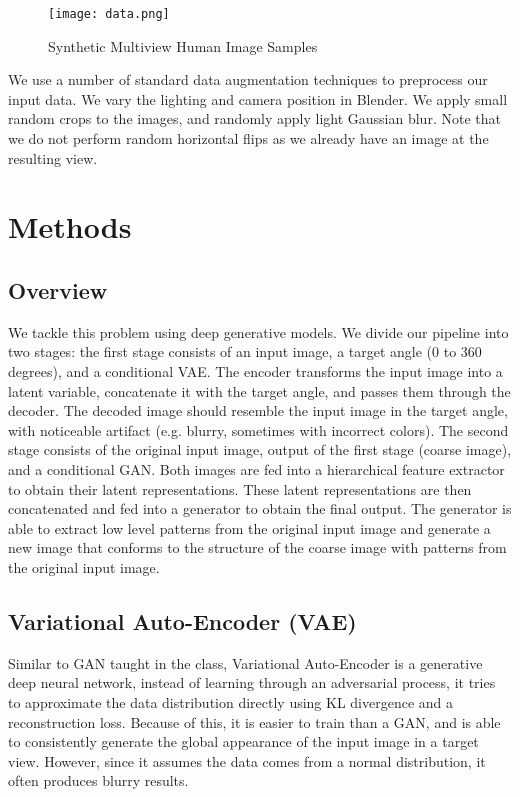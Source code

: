 \documentclass[10pt,conference]{IEEEtran}
\begin{document}
\begin{figure}[htbp]
\centering
\texttt{[image: data.png]}
\caption{Synthetic Multiview Human Image Samples}
\end{figure}

We use a number of standard data augmentation techniques to preprocess our input data. We vary the lighting and camera position in Blender. We apply small random crops to the images, and randomly apply light Gaussian blur. Note that we do not perform random horizontal flips as we already have an image at the resulting view.

\section{Methods}

\subsection{Overview}

We tackle this problem using deep generative models. We divide our pipeline into two stages: the first stage consists of an input image, a target angle (0 to 360 degrees), and a conditional VAE. The encoder transforms the input image into a latent variable, concatenate it with the target angle, and passes them through the decoder. The decoded image should resemble the input image in the target angle, with noticeable artifact (e.g. blurry, sometimes with incorrect colors). The second stage consists of the original input image, output of the first stage (coarse image), and a conditional GAN. Both images are fed into a hierarchical feature extractor to obtain their latent representations. These latent representations are then concatenated and fed into a generator to obtain the final output. The generator is able to extract low level patterns from the original input image and generate a new image that conforms to the structure of the coarse image with patterns from the original input image.

\subsection{Variational Auto-Encoder (VAE)}

Similar to GAN taught in the class, Variational Auto-Encoder is a generative deep neural network, instead of learning through an adversarial process, it tries to approximate the data distribution directly using KL divergence and a reconstruction loss. Because of this, it is easier to train than a GAN, and is able to consistently generate the global appearance of the input image in a target view. However, since it assumes the data comes from a normal distribution, it often produces blurry results. 
\end{document}
